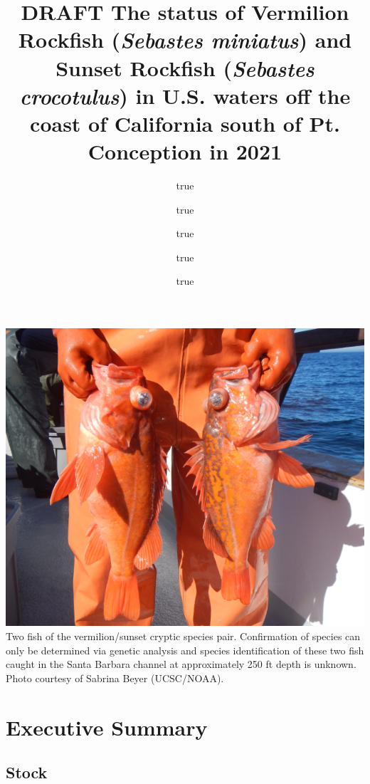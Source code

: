 \documentclass[
  english,
  a4paper,
]{article}
\title{DRAFT The status of Vermilion Rockfish (\emph{Sebastes miniatus}) and Sunset Rockfish (\emph{Sebastes crocotulus}) in U.S. waters off the coast of California south of Pt. Conception in 2021}
\author{true \and true \and true \and true \and true}
\date{}
\begin{document}
\maketitle

{
\setcounter{tocdepth}{2}
\tableofcontents
}
\newcommand\CapeM{$40^\circ 10^\prime N$}
\newcommand\PtC{$34^\circ 27^\prime N$}
\newcommand\CAOR{$42^\circ 00^\prime N$}

\newpage

\includegraphics{cover_photo.png}
Two fish of the vermilion/sunset cryptic species pair. Confirmation of
species can only be determined via genetic analysis and species identification
of these two fish caught in the Santa Barbara channel at approximately 250 ft depth
is unknown. Photo courtesy of Sabrina Beyer (UCSC/NOAA).

\pagebreak
{}
\setcounter{page}{1}

\renewcommand{\thetable}{\roman{table}}
\renewcommand{\thefigure}{\roman{figure}}

\setlength\parskip{0.5em plus 0.1em minus 0.2em}

\hypertarget{executive-summary}{%
\section*{Executive Summary}\label{executive-summary}}

\hypertarget{stock}{%
\subsection*{Stock}\label{stock}}
\end{document}

